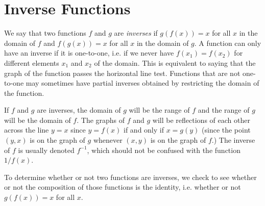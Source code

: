 \section{Inverse Functions}\label{sec:inv_funcs}

We say that two functions $f$ and $g$ are \emph{inverses} if $g(f(x))=x$ for all $x$ in the domain of $f$ and $f(g(x))=x$ for all $x$ in the domain of $g$. A function can only have an inverse if it is one-to-one, i.e. if we never have $f(x_1)=f(x_2)$ for different elements $x_1$ and $x_2$ of the domain. This is equivalent to saying that the graph of the function passes the horizontal line test. Functions that are not one-to-one may sometimes have partial inverses obtained by restricting the domain of the function.

If $f$ and $g$ are inverses, the domain of $g$ will be the range of $f$ and the range of $g$ will be the domain of $f$. The graphs of $f$ and $g$ will be reflections of each other across the line $y=x$ since $y=f(x)$ if and only if $x=g(y)$ (since the point $(y,x)$ is on the graph of $g$ whenever $(x,y)$ is on the graph of $f$.)  The inverse of $f$ is usually denoted $f^{-1}$, which should not be confused with the function $1/f(x)$.

To determine whether or not two functions are inverses, we check to see whether or not the composition of those functions is the identity, i.e. whether or not $g(f(x))=x$ for all $x$. 



